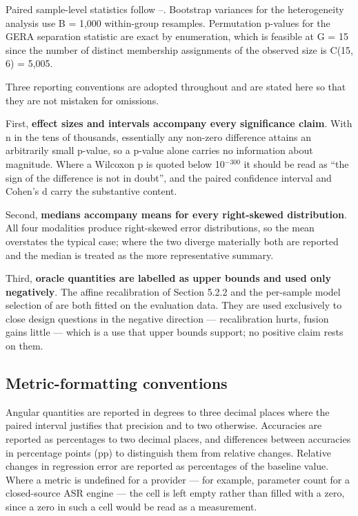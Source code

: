 Paired sample-level statistics follow --. Bootstrap variances for the heterogeneity analysis use B = 1,000 within-group resamples. Permutation p-values for the GERA separation statistic are exact by enumeration, which is feasible at G = 15 since the number of distinct membership assignments of the observed size is C(15, 6) = 5,005.

Three reporting conventions are adopted throughout and are stated here so that they are not mistaken for omissions.

First, \textbf{effect sizes and intervals accompany every significance claim}. With n in the tens of thousands, essentially any non-zero difference attains an arbitrarily small p-value, so a p-value alone carries no information about magnitude. Where a Wilcoxon p is quoted below 10$^{-300}$ it should be read as ``the sign of the difference is not in doubt'', and the paired confidence interval and Cohen's d carry the substantive content.

Second, \textbf{medians accompany means for every right-skewed distribution}. All four modalities produce right-skewed error distributions, so the mean overstates the typical case; where the two diverge materially both are reported and the median is treated as the more representative summary.

Third, \textbf{oracle quantities are labelled as upper bounds and used only negatively}. The affine recalibration of Section 5.2.2 and the per-sample model selection of  are both fitted on the evaluation data. They are used exclusively to close design questions in the negative direction --- recalibration hurts, fusion gains little --- which is a use that upper bounds support; no positive claim rests on them.

\FloatBarrier

\subsection{Metric-formatting conventions}

Angular quantities are reported in degrees to three decimal places where the paired interval justifies that precision and to two otherwise. Accuracies are reported as percentages to two decimal places, and differences between accuracies in percentage points (pp) to distinguish them from relative changes. Relative changes in regression error are reported as percentages of the baseline value. Where a metric is undefined for a provider --- for example, parameter count for a closed-source ASR engine --- the cell is left empty rather than filled with a zero, since a zero in such a cell would be read as a measurement.

